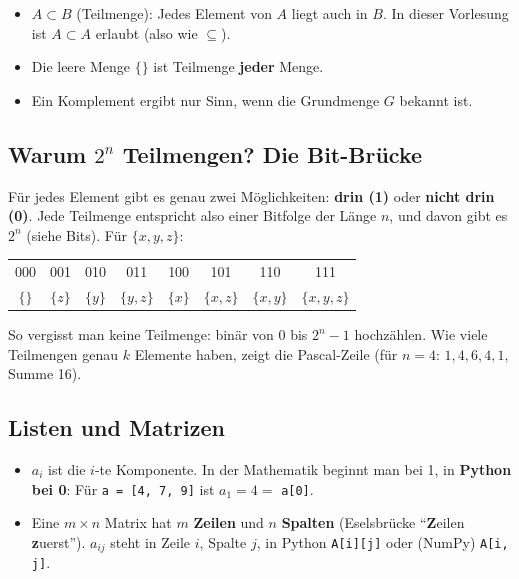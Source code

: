 \begin{merke}
  \begin{itemize}[nosep]
    \item $A \subset B$ (Teilmenge): Jedes Element von $A$ liegt auch in $B$.
          In dieser Vorlesung ist $A \subset A$ erlaubt (also wie $\subseteq$).
    \item Die leere Menge $\{\}$ ist Teilmenge \textbf{jeder} Menge.
    \item Ein Komplement ergibt nur Sinn, wenn die Grundmenge $G$ bekannt ist.
  \end{itemize}
\end{merke}

\subsection*{Warum $2^n$ Teilmengen? Die Bit-Brücke}
Für jedes Element gibt es genau zwei Möglichkeiten: \textbf{drin (1)} oder
\textbf{nicht drin (0)}. Jede Teilmenge entspricht also einer Bitfolge der Länge $n$,
und davon gibt es $2^n$ (siehe Bits). Für $\{x, y, z\}$:

\begin{center}
  \small
  \begin{tabular}{*{8}{c}}
    \toprule
    000 & 001 & 010 & 011 & 100 & 101 & 110 & 111 \\
    $\{\}$ & $\{z\}$ & $\{y\}$ & $\{y,z\}$ & $\{x\}$ & $\{x,z\}$ & $\{x,y\}$ & $\{x,y,z\}$ \\
    \bottomrule
  \end{tabular}
\end{center}
So vergisst man keine Teilmenge: binär von 0 bis $2^n - 1$ hochzählen. Wie viele
Teilmengen genau $k$ Elemente haben, zeigt die Pascal-Zeile
(für $n = 4$: $1, 4, 6, 4, 1$, Summe 16).

\subsection*{Listen und Matrizen}
\begin{itemize}
  \item $a_i$ ist die $i$-te Komponente. In der Mathematik beginnt man bei 1, in
        \textbf{Python bei 0}: Für \texttt{a = [4, 7, 9]} ist $a_1 = 4 = $ \texttt{a[0]}.
  \item Eine $m \times n$ Matrix hat $m$ \textbf{Zeilen} und $n$ \textbf{Spalten}
        (Eselsbrücke \enquote{\textbf{Z}eilen \textbf{z}uerst}). $a_{ij}$ steht in Zeile
        $i$, Spalte $j$, in Python \texttt{A[i][j]} oder (NumPy) \texttt{A[i, j]}.
\end{itemize}

